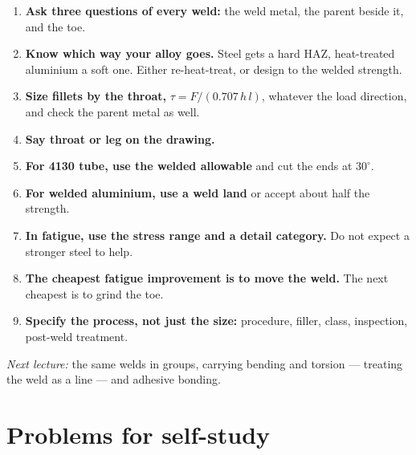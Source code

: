 \documentclass[11pt,a4paper]{article}
\begin{document}
\begin{enumerate}[leftmargin=*,itemsep=3pt]
\item \textbf{Ask three questions of every weld:} the weld metal, the parent beside it, and the toe.
\item \textbf{Know which way your alloy goes.} Steel gets a hard HAZ, heat-treated aluminium a
  soft one. Either re-heat-treat, or design to the welded strength.
\item \textbf{Size fillets by the throat,} $\tau=F/(0.707\,h\,l)$, whatever the load direction, and
  check the parent metal as well.
\item \textbf{Say throat or leg on the drawing.}
\item \textbf{For 4130 tube, use the welded allowable} and cut the ends at $30^\circ$.
\item \textbf{For welded aluminium, use a weld land} or accept about half the strength.
\item \textbf{In fatigue, use the stress range and a detail category.} Do not expect a stronger
  steel to help.
\item \textbf{The cheapest fatigue improvement is to move the weld.} The next cheapest is to grind
  the toe.
\item \textbf{Specify the process, not just the size:} procedure, filler, class, inspection,
  post-weld treatment.
\end{enumerate}

\noindent \emph{Next lecture:} the same welds in groups, carrying bending and torsion --- treating
the weld as a line --- and adhesive bonding.

\section{Problems for self-study}
\end{document}
